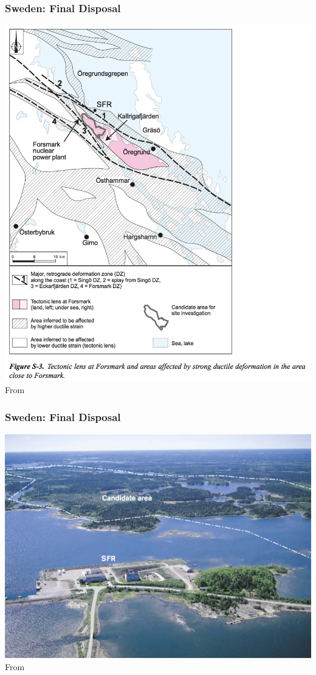\begin{frame}[c]
\frametitle{Sweden: Final Disposal}

\includegraphics[height=\textheight]{./images/sweden-forsmark-map}
From \cite{skb_long-term_2011}

\end{frame}
\begin{frame}[c]
\frametitle{Sweden: Final Disposal}
\includegraphics[height=\textheight]{./images/sweden-forsmark-candidate}
From \cite{skb_long-term_2011}
\end{frame}


